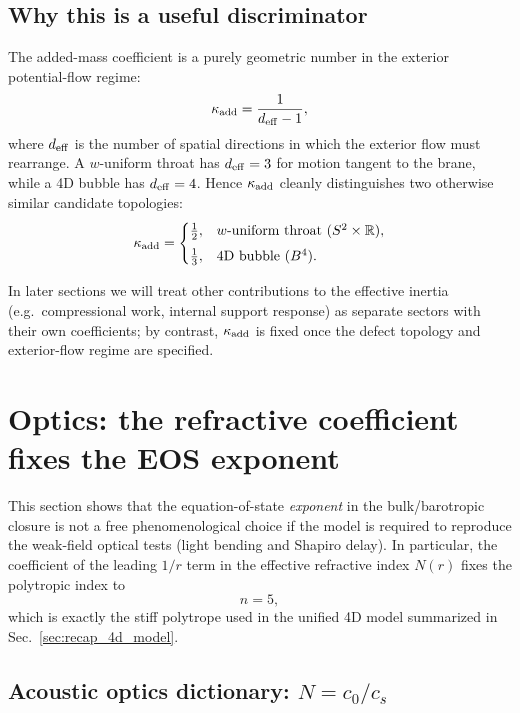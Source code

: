 \documentclass[11pt]{article}
\begin{document}
\subsection{Why this is a useful discriminator}

The added-mass coefficient is a purely geometric number in the exterior potential-flow regime:
\begin{equation}
  \kappa_{\rm add}=\frac{1}{d_{\rm eff}-1},
\end{equation}
where \(d_{\rm eff}\) is the number of spatial directions in which the exterior flow must rearrange.
A \(w\)-uniform throat has \(d_{\rm eff}=3\) for motion tangent to the brane, while a 4D bubble has \(d_{\rm eff}=4\).
Hence \(\kappa_{\rm add}\) cleanly distinguishes two otherwise similar candidate topologies:
\begin{equation}
  \kappa_{\rm add}=
  \begin{cases}
    \tfrac12, & \text{\(w\)-uniform throat } (S^2\times\mathbb R),\\[4pt]
    \tfrac13, & \text{4D bubble } (B^4).
  \end{cases}
\end{equation}

In later sections we will treat other contributions to the effective inertia (e.g.\ compressional work, internal support response) as separate sectors with their own coefficients; by contrast, \(\kappa_{\rm add}\) is fixed once the defect topology and exterior-flow regime are specified.

\section{Optics: the refractive coefficient fixes the EOS exponent}
\label{sec:optics_eos}

This section shows that the equation-of-state \emph{exponent} in the bulk/barotropic closure is not a free phenomenological choice if the model is required to reproduce the weak-field optical tests (light bending and Shapiro delay). In particular, the coefficient of the leading $1/r$ term in the effective refractive index $N(r)$ fixes the polytropic index to
\begin{equation}
n=5,
\end{equation}
which is exactly the stiff polytrope used in the unified 4D model summarized in Sec.~\ref{sec:recap_4d_model}. 

\subsection{Acoustic optics dictionary: $N=c_0/c_s$}
\end{document}
